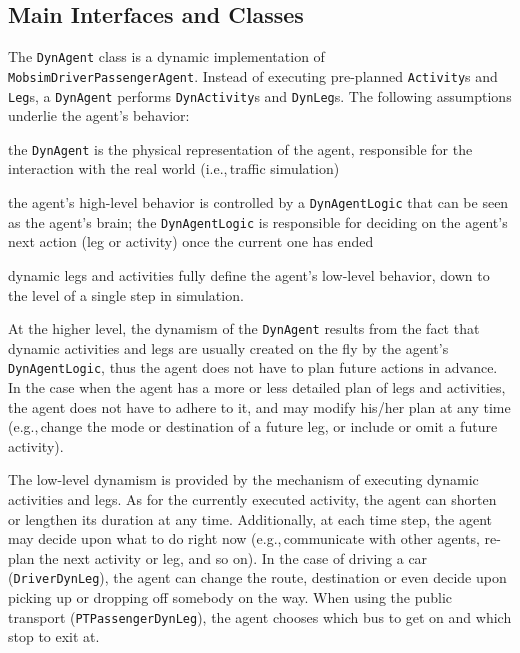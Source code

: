 \subsection{Main Interfaces and Classes}
The \lstinline$DynAgent$ class is a dynamic implementation of \lstinline$MobsimDriverPassengerAgent$. Instead of executing pre-planned \lstinline$Activity$s and \lstinline$Leg$s, a \lstinline$DynAgent$ performs \lstinline$DynActivity$s and \lstinline$DynLeg$s. The following assumptions underlie the agent's behavior:
%
\begin{compactitem}
	\item the \lstinline$DynAgent$ is the physical representation of the agent, responsible for the interaction with the real world (i.e.,\,traffic simulation)

	\item the agent's high-level behavior is controlled by a \lstinline$DynAgentLogic$ that can be seen as the agent's brain; the \lstinline$DynAgentLogic$ is responsible for deciding on the agent's next action (leg or activity) once the current one has ended
	
	\item dynamic legs and activities fully define the agent's low-level behavior, down to the level of a single step in simulation.
\end{compactitem}
%
At the higher level, the dynamism of the \lstinline$DynAgent$ results from the fact that dynamic activities and legs are usually created on the fly by the agent's \lstinline$DynAgentLogic$, thus the agent does not have to plan future actions in advance. In the case when the agent has a more or less detailed plan of legs and activities, the agent does not have to adhere to it, and may modify his/her plan at any time (e.g.,\,change the mode or destination of a future leg, or include or omit a future activity).

The low-level dynamism is provided by the mechanism of executing dynamic activities and legs. As for the currently executed activity, the agent can shorten or lengthen its duration at any time. Additionally, at each time step, the agent may decide upon what to do right now (e.g.,\,communicate with other agents, re-plan the next activity or leg, and so on). In the case of driving a car (\lstinline$DriverDynLeg$), the agent can change the route, destination or even decide upon picking up or dropping off somebody on the way. When using the public transport (\lstinline$PTPassengerDynLeg$), the agent chooses which bus to get on and which stop to exit at.

